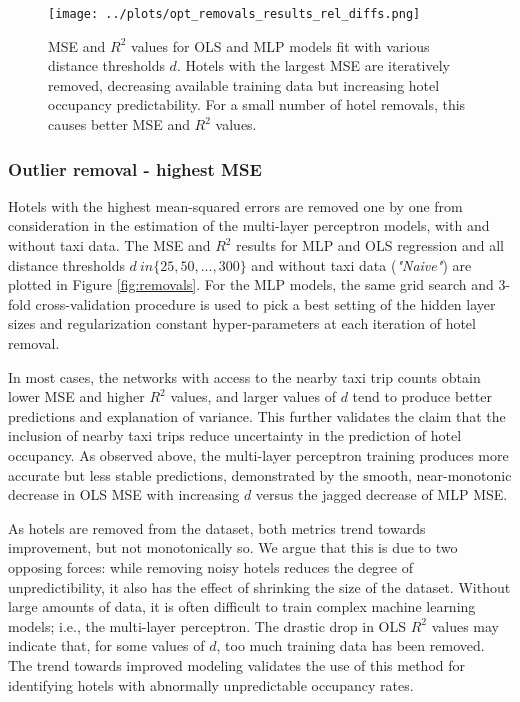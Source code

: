 \documentclass[useAMS, usenatbib]{biom}
\begin{document}
\begin{figure}
	\centering
    \captionsetup{justification=centering}
	\texttt{[image: ../plots/opt\_removals\_results\_rel\_diffs.png]}
	\caption{MSE and $R^2$ values for OLS and MLP models fit with various distance thresholds $d$. Hotels with the largest MSE are iteratively removed, decreasing available training data but increasing hotel occupancy predictability. For a small number of hotel removals, this causes better MSE and $R^2$ values.}
	\label{fig:rel_diffs_removals}
\end{figure}

\subsubsection{Outlier removal - highest MSE}

Hotels with the highest mean-squared errors are removed one by one from consideration in the estimation of the multi-layer perceptron models, with and without taxi data. The MSE and $R^2$ results for MLP and OLS regression and all distance thresholds $d \ in \{25, 50, ..., 300 \}$ and without taxi data (\textit{"Naive"}) are plotted in Figure \ref{fig:removals}. For the MLP models, the same grid search and 3-fold cross-validation procedure is used to pick a best setting of the hidden layer sizes and regularization constant hyper-parameters at each iteration of hotel removal.

In most cases, the networks with access to the nearby taxi trip counts obtain lower MSE and higher $R^2$ values, and larger values of $d$ tend to produce better predictions and explanation of variance. This further validates the claim that the inclusion of nearby taxi trips reduce uncertainty in the prediction of hotel occupancy. As observed above, the multi-layer perceptron training produces more accurate but less stable predictions, demonstrated by the smooth, near-monotonic decrease in OLS MSE with increasing $d$ versus the jagged decrease of MLP MSE. 

As hotels are removed from the dataset, both metrics trend towards improvement, but not monotonically so. We argue that this is due to two opposing forces: while removing noisy hotels reduces the degree of unpredictibility, it also has the effect of shrinking the size of the dataset. Without large amounts of data, it is often difficult to train complex machine learning models; i.e., the multi-layer perceptron. The drastic drop in OLS $R^2$ values may indicate that, for some values of $d$, too much training data has been removed. The trend towards improved modeling validates the use of this method for identifying hotels with abnormally unpredictable occupancy rates.
\end{document}
